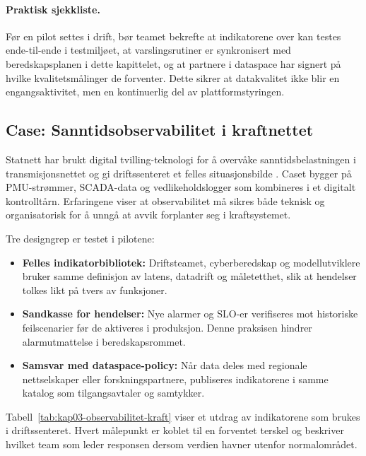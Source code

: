 \paragraph{Praktisk sjekkliste.} Før en pilot settes i drift, bør teamet bekrefte at indikatorene over kan testes ende-til-ende i testmiljøet, at varslingsrutiner er synkronisert med beredskapsplanen i dette kapittelet, og at partnere i dataspace har signert på hvilke kvalitetsmålinger de forventer. Dette sikrer at datakvalitet ikke blir en engangsaktivitet, men en kontinuerlig del av plattformstyringen.

\subsection{Case: Sanntidsobservabilitet i kraftnettet}
Statnett har brukt digital tvilling-teknologi for å overvåke sanntidsbelastningen i transmisjonsnettet og gi driftssenteret et felles situasjonsbilde \citep{statnett2023digital,statnett2024kontrolltarn}. Caset bygger på PMU-strømmer, SCADA-data og vedlikeholdslogger som kombineres i et digitalt kontrolltårn. Erfaringene viser at observabilitet må sikres både teknisk og organisatorisk for å unngå at avvik forplanter seg i kraftsystemet.

Tre designgrep er testet i pilotene:
\begin{itemize}
    \item \textbf{Felles indikatorbibliotek:} Driftsteamet, cyberberedskap og modellutviklere bruker samme definisjon av latens, datadrift og måletetthet, slik at hendelser tolkes likt på tvers av funksjoner.
    \item \textbf{Sandkasse for hendelser:} Nye alarmer og SLO-er verifiseres mot historiske feilscenarier før de aktiveres i produksjon. Denne praksisen hindrer alarmutmattelse i beredskapsrommet.
    \item \textbf{Samsvar med dataspace-policy:} Når data deles med regionale nettselskaper eller forskningspartnere, publiseres indikatorene i samme katalog som tilgangsavtaler og samtykker.
\end{itemize}

Tabell~\ref{tab:kap03-observabilitet-kraft} viser et utdrag av indikatorene som brukes i driftssenteret. Hvert målepunkt er koblet til en forventet terskel og beskriver hvilket team som leder responsen dersom verdien havner utenfor normalområdet.


